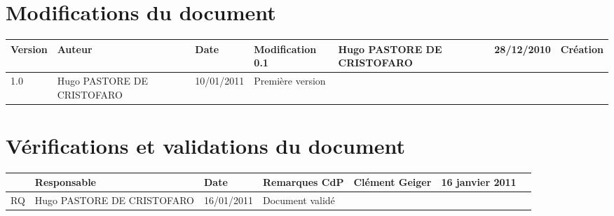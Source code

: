 
\section*{Modifications du document}

\begin{center}
\begin{longtable}{|m{14mm}||m{36mm}|m{36mm}|m{60mm}|}
\hline
Version & Auteur & Date & Modification\endhead \hline
0.1
& %
Hugo PASTORE DE CRISTOFARO
& %
28/12/2010
& %
Création
\\\hline
1.0
& %
Hugo PASTORE DE CRISTOFARO
& %
10/01/2011
& %
Première version
\\\hline
\end{longtable}
\end{center}


\section*{Vérifications et validations du document}

\begin{center}
\begin{longtable}{|m{15mm}|m{36mm}|m{36mm}|m{60mm}|}
\hline
 & Responsable & Date & Remarques\endhead \hline
CdP

& %
Clément Geiger

& %
16 janvier 2011

& %

\\\hline
RQ
& %
Hugo PASTORE DE CRISTOFARO
& %
16/01/2011
& %
Document validé
\\\hline
\end{longtable}
\end{center}

\pagebreak
